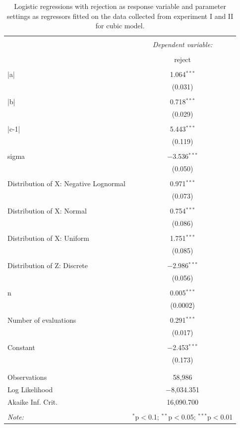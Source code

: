 \documentclass{monashthesis}
\theoremstyle{definition}
\theoremstyle{definition}
\theoremstyle{definition}
\theoremstyle{definition}
\theoremstyle{remark}
\begin{document}
\begin{table}[!htbp] \centering 
  \caption{Logistic regressions with rejection as response variable and parameter settings as regressors fitted on the data collected from experiment I and II for cubic model.} 
  \label{tab:rejectfactorcubic} 
\begin{tabular}{@{\extracolsep{5pt}}lc} 
\\[-1.8ex]\hline 
\hline \\[-1.8ex] 
 & \multicolumn{1}{c}{\textit{Dependent variable:}} \\ 
\cline{2-2} 
\\[-1.8ex] & reject \\ 
\hline \\[-1.8ex] 
 |a| & 1.064$^{***}$ \\ 
  & (0.031) \\ 
  & \\ 
 |b| & 0.718$^{***}$ \\ 
  & (0.029) \\ 
  & \\ 
 |c-1| & 5.443$^{***}$ \\ 
  & (0.119) \\ 
  & \\ 
 sigma & $-$3.536$^{***}$ \\ 
  & (0.050) \\ 
  & \\ 
 Distribution of X: Negative Lognormal & 0.971$^{***}$ \\ 
  & (0.073) \\ 
  & \\ 
 Distribution of X: Normal & 0.754$^{***}$ \\ 
  & (0.086) \\ 
  & \\ 
 Distribution of X: Uniform & 1.751$^{***}$ \\ 
  & (0.085) \\ 
  & \\ 
 Distribution of Z: Discrete & $-$2.986$^{***}$ \\ 
  & (0.056) \\ 
  & \\ 
 n & 0.005$^{***}$ \\ 
  & (0.0002) \\ 
  & \\ 
 Number of evaluations & 0.291$^{***}$ \\ 
  & (0.017) \\ 
  & \\ 
 Constant & $-$2.453$^{***}$ \\ 
  & (0.173) \\ 
  & \\ 
\hline \\[-1.8ex] 
Observations & 58,986 \\ 
Log Likelihood & $-$8,034.351 \\ 
Akaike Inf. Crit. & 16,090.700 \\ 
\hline 
\hline \\[-1.8ex] 
\textit{Note:}  & \multicolumn{1}{r}{$^{*}$p$<$0.1; $^{**}$p$<$0.05; $^{***}$p$<$0.01} \\ 
\end{tabular} 
\end{table}
\end{document}
